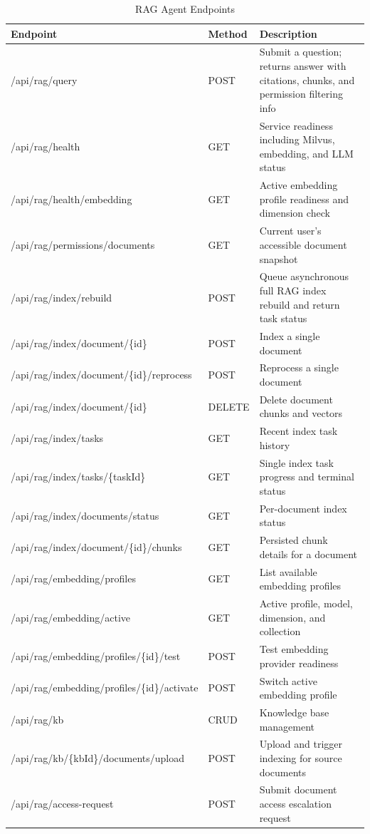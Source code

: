 \begin{table}[H]
\small\singlespacing
\centering
\caption{RAG Agent Endpoints}
\label{tab:api-rag}
\begin{tabularx}{\textwidth}{>{\RaggedRight\arraybackslash}p{}>{\RaggedRight\arraybackslash}p{1.3cm}>{\RaggedRight\arraybackslash}X}
\toprule
\textbf{Endpoint} & \textbf{Method} & \textbf{Description} \\
\midrule
/api/rag/query & POST & Submit a question; returns answer with citations, chunks, and permission filtering info \\
/api/rag/health & GET & Service readiness including Milvus, embedding, and LLM status \\
/api/rag/health/embedding & GET & Active embedding profile readiness and dimension check \\
/api/rag/permissions/documents & GET & Current user's accessible document snapshot \\
/api/rag/index/rebuild & POST & Queue asynchronous full RAG index rebuild and return task status \\
/api/rag/index/document/\{id\} & POST & Index a single document \\
/api/rag/index/document/\{id\}/reprocess & POST & Reprocess a single document \\
/api/rag/index/document/\{id\} & DELETE & Delete document chunks and vectors \\
/api/rag/index/tasks & GET & Recent index task history \\
/api/rag/index/tasks/\{taskId\} & GET & Single index task progress and terminal status \\
/api/rag/index/documents/status & GET & Per-document index status \\
/api/rag/index/document/\{id\}/chunks & GET & Persisted chunk details for a document \\
/api/rag/embedding/profiles & GET & List available embedding profiles \\
/api/rag/embedding/active & GET & Active profile, model, dimension, and collection \\
/api/rag/embedding/profiles/\{id\}/test & POST & Test embedding provider readiness \\
/api/rag/embedding/profiles/\{id\}/activate & POST & Switch active embedding profile \\
/api/rag/kb & CRUD & Knowledge base management \\
/api/rag/kb/\{kbId\}/documents/upload & POST & Upload and trigger indexing for source documents \\
/api/rag/access-request & POST & Submit document access escalation request \\
\bottomrule
\end{tabularx}
\end{table}

